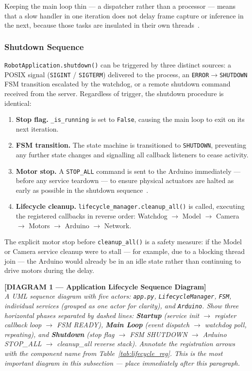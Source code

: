 Keeping the main loop thin — a dispatcher rather than a processor —
means that a slow handler in one iteration does not delay frame
capture or inference in the next, because those tasks are insulated
in their own threads~\cite{silberschatz2018os}.

\subsubsection{Shutdown Sequence}
\label{sec:shutdown_seq}

\texttt{RobotApplication.shutdown()} can be triggered by three
distinct sources: a POSIX signal (\texttt{SIGINT} / \texttt{SIGTERM})
delivered to the process, an \texttt{ERROR}$\to$\texttt{SHUTDOWN}
FSM transition escalated by the watchdog, or a remote shutdown
command received from the server. Regardless of trigger, the shutdown
procedure is identical:

\begin{enumerate}
	\item \textbf{Stop flag.} \texttt{\_is\_running} is set to
	\texttt{False}, causing the main loop to exit on its next
	iteration.
	\item \textbf{FSM transition.} The state machine is transitioned
	to \texttt{SHUTDOWN}, preventing any further state changes
	and signalling all callback listeners to cease activity.
	\item \textbf{Motor stop.} A \texttt{STOP\_ALL} command is sent
	to the Arduino immediately — before any service teardown
	— to ensure physical actuators are halted as early as
	possible in the shutdown sequence~\cite{kopetz2011real}.
	\item \textbf{Lifecycle cleanup.} \texttt{lifecycle\_manager.cleanup\_all()}
	is called, executing the registered callbacks in reverse
	order: Watchdog $\to$ Model $\to$ Camera $\to$ Motors
	$\to$ Arduino $\to$ Network.
\end{enumerate}

The explicit motor stop before \texttt{cleanup\_all()} is a safety
measure: if the Model or Camera service cleanup were to stall —
for example, due to a blocking thread join — the Arduino would
already be in an idle state rather than continuing to drive motors
during the delay.

\bigskip
\noindent\textbf{[DIAGRAM 1 — Application Lifecycle Sequence
	Diagram]}\\
\textit{A UML sequence diagram with five actors: \texttt{app.py},
	\texttt{LifecycleManager}, \texttt{FSM}, individual services (grouped
	as one actor for clarity), and \texttt{Arduino}. Show three
	horizontal phases separated by dashed lines: \textbf{Startup}
	(service init $\to$ register callback loop $\to$ FSM READY),
	\textbf{Main Loop} (event dispatch $\to$ watchdog poll, repeating),
	and \textbf{Shutdown} (stop flag $\to$ FSM SHUTDOWN $\to$ Arduino
	STOP\_ALL $\to$ cleanup\_all reverse stack). Annotate the
	registration arrows with the component name from
	Table~\ref{tab:lifecycle_reg}. This is the most important diagram
	in this subsection — place immediately after this paragraph.}
\bigskip


